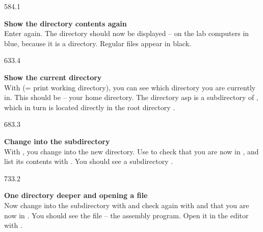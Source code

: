 \documentclass{aslab}
\begin{document}
\begin{region}[pitch=12.0]{584.1}
\begin{alphatasks}[start=3]
\item \textbf{Show the directory contents again}\\
  Enter  again. The directory  should now be
  displayed -- on the lab computers in blue, because it is a directory.
  Regular files appear in black.
\end{alphatasks}
\end{region}

\begin{region}[pitch=12.3]{633.4}
\begin{alphatasks}[start=4]
\item \textbf{Show the current directory}\\
  With  (= print working directory), you can see which directory
  you are currently in. This should be  -- your home
  directory. The directory asp is a subdirectory of , which in
  turn is located directly in the root directory \code{/}.
\end{alphatasks}
\end{region}

\begin{region}[pitch=12.3]{683.3}
\begin{alphatasks}[start=5]
\item \textbf{Change into the subdirectory}\\
  With , you change into the new directory. Use
   to check that you are now in ,
  and list its contents with . You should see a subdirectory
  .
\end{alphatasks}
\end{region}

\begin{region}[pitch=12.3]{733.2}
\begin{alphatasks}[start=6]
\item \textbf{One directory deeper and opening a file}\\
  Now change into the subdirectory with  and check again with
   and  that you are now in
  . You should see the file
   -- the assembly program. Open it in the editor with
  .
\end{alphatasks}
\end{region}
\end{document}
